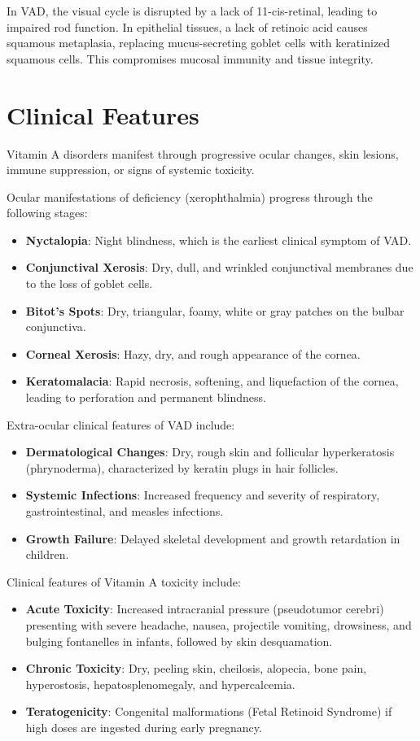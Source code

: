 In VAD, the visual cycle is disrupted by a lack of 11-cis-retinal, leading to impaired rod function. In epithelial tissues, a lack of retinoic acid causes squamous metaplasia, replacing mucus-secreting goblet cells with keratinized squamous cells. This compromises mucosal immunity and tissue integrity.

\section*{Clinical Features}
Vitamin A disorders manifest through progressive ocular changes, skin lesions, immune suppression, or signs of systemic toxicity.

Ocular manifestations of deficiency (xerophthalmia) progress through the following stages:
\begin{itemize}
    \item \textbf{Nyctalopia}: Night blindness, which is the earliest clinical symptom of VAD.
    \item \textbf{Conjunctival Xerosis}: Dry, dull, and wrinkled conjunctival membranes due to the loss of goblet cells.
    \item \textbf{Bitot's Spots}: Dry, triangular, foamy, white or gray patches on the bulbar conjunctiva.
    \item \textbf{Corneal Xerosis}: Hazy, dry, and rough appearance of the cornea.
    \item \textbf{Keratomalacia}: Rapid necrosis, softening, and liquefaction of the cornea, leading to perforation and permanent blindness.
\end{itemize}

Extra-ocular clinical features of VAD include:
\begin{itemize}
    \item \textbf{Dermatological Changes}: Dry, rough skin and follicular hyperkeratosis (phrynoderma), characterized by keratin plugs in hair follicles.
    \item \textbf{Systemic Infections}: Increased frequency and severity of respiratory, gastrointestinal, and measles infections.
    \item \textbf{Growth Failure}: Delayed skeletal development and growth retardation in children.
\end{itemize}

Clinical features of Vitamin A toxicity include:
\begin{itemize}
    \item \textbf{Acute Toxicity}: Increased intracranial pressure (pseudotumor cerebri) presenting with severe headache, nausea, projectile vomiting, drowsiness, and bulging fontanelles in infants, followed by skin desquamation.
    \item \textbf{Chronic Toxicity}: Dry, peeling skin, cheilosis, alopecia, bone pain, hyperostosis, hepatosplenomegaly, and hypercalcemia.
    \item \textbf{Teratogenicity}: Congenital malformations (Fetal Retinoid Syndrome) if high doses are ingested during early pregnancy.
\end{itemize}

